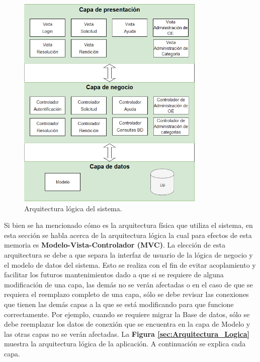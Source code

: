 \begin{figure}[htb]
    \hspace{12mm}
    \includegraphics[width=0.8\textwidth]{Imagenes/Arquitectura_logica.png}
    \caption{\label{fig: Arquitectura_Logica}Arquitectura lógica del sistema.}
\end{figure}

Si bien se ha mencionado cómo es la arquitectura física que utiliza el sistema, en esta sección se habla acerca de la arquitectura lógica la cual para efectos de esta memoria es \textbf{Modelo-Vista-Controlador (MVC)}. La elección de esta arquitectura se debe a que separa la interfaz de usuario de la lógica de negocio y el modelo de datos del sistema. Esto se realiza con el fin de evitar acoplamiento y facilitar los futuros mantenimientos dado a que si se requiere de alguna modificación de una capa, las demás no se verán afectadas o en el caso de que se requiera el reemplazo completo de una capa, sólo se debe revisar las conexiones que tienen las demás capas a la que se está modificando para que funcione correctamente. Por ejemplo, cuando se requiere migrar la Base de datos, sólo se debe reemplazar los datos de conexión que se encuentra en la capa de Modelo y las otras capas no se verán afectadas. La \textbf{Figura \ref{sec:Arquitectura_Logica}} muestra la arquitectura lógica de la aplicación. A continuación se explica cada capa.

